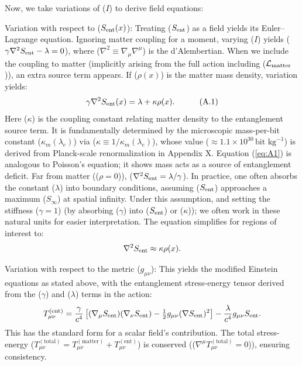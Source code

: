 \documentclass[11pt]{article}
\begin{document}
Now, we take variations of ($I$) to derive field equations:

Variation with respect to ($S_{\rm ent}(x)$): Treating ($S_{\rm ent}$) as a field yields its Euler–Lagrange equation. Ignoring matter coupling for a moment, varying ($I$) yields ($\gamma \nabla^2 S_{\rm ent} - \lambda = 0$), where ($\nabla^2 \equiv \nabla_\mu \nabla^\mu$) is the d’Alembertian. When we include the coupling to matter (implicitly arising from the full action including ($\mathcal{L}_{\rm matter}$)), an extra source term appears. If ($\rho(x)$) is the matter mass density, variation yields: 
\begin{equation} 
\gamma \nabla^2 S_{\rm ent}(x) = \lambda + \kappa \rho(x) . \quad \label{eq:A1} \tag{A.1} 
\end{equation}
Here ($\kappa$) is the coupling constant relating matter density to the entanglement source term. It is fundamentally determined by the microscopic mass-per-bit constant ($\kappa_m(\lambda_e)$) via ($\kappa \equiv 1/\kappa_m(\lambda_e)$), whose value ($\approx 1.1 \times 10^{30}\,\text{bit kg}^{-1}$) is derived from Planck-scale renormalization in Appendix X. Equation (\ref{eq:A1}) is analogous to Poisson’s equation; it shows mass acts as a source of entanglement deficit. Far from matter (($\rho=0$)), ($\nabla^2 S_{\rm ent} = \lambda/\gamma$). In practice, one often absorbs the constant ($\lambda$) into boundary conditions, assuming ($S_{\rm ent}$) approaches a maximum ($S_\infty$) at spatial infinity. Under this assumption, and setting the stiffness ($\gamma=1$) (by absorbing ($\gamma$) into ($S_{\rm ent}$) or ($\kappa$)); we often work in these natural units for easier interpretation. The equation simplifies for regions of interest to: 
\begin{equation*}
\nabla^2 S_{\rm ent} \approx \kappa \rho(x) . 
\end{equation*}

Variation with respect to the metric ($g_{\mu\nu}$): This yields the modified Einstein equations as stated above, with the entanglement stress-energy tensor derived from the ($\gamma$) and ($\lambda$) terms in the action: 
\begin{equation*}
T_{\mu\nu}^{(\text{ent})} = \frac{\gamma}{c^4}\left[(\nabla_\mu S_{\rm ent})(\nabla_\nu S_{\rm ent}) - \tfrac{1}{2}g_{\mu\nu}(\nabla S_{\rm ent})^2\right] - \frac{\lambda}{c^4} g_{\mu\nu} S_{\rm ent}. 
\end{equation*}
This has the standard form for a scalar field's contribution. The total stress-energy ($T_{\mu\nu}^{(\text{total})} = T_{\mu\nu}^{(\text{matter})} + T_{\mu\nu}^{(\text{ent})}$) is conserved (($\nabla^\mu T_{\mu\nu}^{(\text{total})} = 0$)), ensuring consistency.
\end{document}
